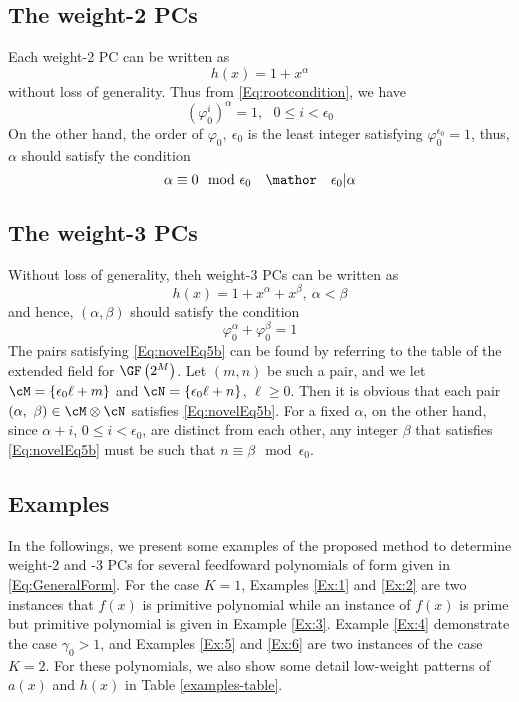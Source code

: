 \subsection{The weight-2 PCs}
\label{sec:PC2}
Each weight-2 PC can be written as 
\begin{equation}
h(x)=1+x^{\alpha}
\label{eq:wt2-gen-form}
\end{equation}
without loss of generality. Thus from \eqref{Eq:rootcondition}, we have 
\begin{equation}
(\varphi_0^i)^{\alpha} =1,~~~ 0 \leq i < \epsilon_0
\label{novelEq5b}
\end{equation}
On the other hand, the order of $\varphi_0,~\epsilon_0$ is the least integer satisfying $\varphi_0^{\epsilon_0} = 1$, thus, $\alpha$ should satisfy the condition
\begin{equation}
\alpha \equiv 0 \mod \epsilon_0~~~\mathor~~~\epsilon_0|\alpha
\label{eq:wt2-alpha}
\end{equation}

\subsection{The weight-3 PCs}

Without loss of generality, theh weight-3 PCs can be written as 
\begin{equation}
h(x)=1+x^{\alpha}+x^{\beta},~\alpha < \beta
\label{novelEqwt3}
\end{equation}
and hence, $(\alpha,\beta)$ should satisfy the condition
\begin{equation}
\varphi_0^{\alpha}+\varphi_0^{\beta}= 1
\label{Eq:novelEq5b}
\end{equation}
The pairs satisfying \eqref{Eq:novelEq5b} can be found by referring to the table of the extended field for $\GF\left(2^M\right)$. 
Let $(m,n)$ be such a pair, and we let $\cM=\{\epsilon_0 \ell+m\}$ and $\cN=\{\epsilon_0 \ell+n\}$, $\ell \geq 0$. Then it is obvious that each pair $(\alpha,~\beta) \in \cM \otimes \cN$ satisfies
\eqref{Eq:novelEq5b}. For a fixed $\alpha$, on the other hand, since $\alpha+i$, $0 \leq i < \epsilon_0$, are distinct from each other, any integer $\beta$ that satisfies \eqref{Eq:novelEq5b} must be such that $n\equiv \beta \mod \epsilon_0$.

\subsection{Examples}

In the followings, we present some examples of the proposed method to determine weight-2 and -3 PCs for several feedfoward polynomials of form given in \eqref{Eq:GeneralForm}. For the case $K=1$, Examples \ref{Ex:1} and \ref{Ex:2} are two instances that $f(x)$ is primitive polynomial while an instance of $f(x)$ is prime but primitive polynomial is given in Example \ref{Ex:3}. Example \ref{Ex:4} demonstrate the case $\gamma_0 > 1$, and Examples \ref{Ex:5} and \ref{Ex:6} are two instances of the case $K=2$. For these polynomials, we also show some detail low-weight patterns of $a(x)$ and $h(x)$ in Table \ref{examples-table}.

